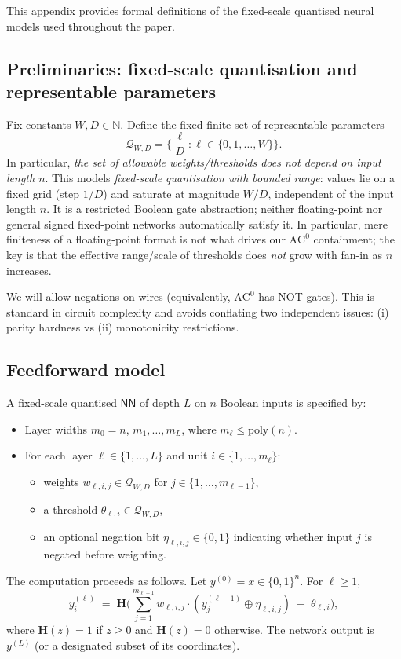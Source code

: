 \documentclass[twoside,11pt]{article}
\newcommand{\AC}{\mathrm{AC}}
\newcommand{\poly}{\mathrm{poly}}
\newcommand{\Heav}{\mathbf{H}}
\newcommand{\NN}{\mathsf{NN}}
\newcommand{\bits}{\{0,1\}}
\newcommand{\N}{\mathbb{N}}
\newcommand{\Qset}{\mathcal{Q}}
\numberwithin{theorem}{section}
\numberwithin{equation}{section}
\begin{document}
This appendix provides formal definitions of the fixed-scale quantised neural models used throughout the paper.

\subsection{Preliminaries: fixed-scale quantisation and representable parameters}
\label{app:precision}

Fix constants $W,D\in\N$.
Define the fixed finite set of representable parameters
\[
\Qset_{W,D}=\Big\{\frac{\ell}{D}: \ell\in\{0,1,\dots,W\}\Big\}.
\]
In particular, \emph{the set of allowable weights/thresholds does not depend on input length $n$}.
This models \emph{fixed-scale quantisation with bounded range}: values lie on a fixed grid (step $1/D$) and saturate at magnitude $W/D$, independent of the input length $n$.
It is a restricted Boolean gate abstraction; neither floating-point nor general signed fixed-point networks automatically satisfy it.
In particular, mere finiteness of a floating-point format is not what drives our $\AC^0$ containment; the key is that the effective range/scale of thresholds does \emph{not} grow with fan-in as $n$ increases.

We will allow negations on wires (equivalently, $\AC^0$ has NOT gates). This is standard in circuit complexity and avoids conflating two independent issues: (i) parity hardness vs (ii) monotonicity restrictions.

\subsection{Feedforward model}
\label{app:NN}

\begin{definition}
\label{def:NN-formal}
A fixed-scale quantised $\NN$ of depth $L$ on $n$ Boolean inputs is specified by:
\begin{itemize}[leftmargin=*]
\item Layer widths $m_0=n$, $m_1,\dots,m_L$, where $m_\ell\le \poly(n)$.
\item For each layer $\ell\in\{1,\dots,L\}$ and unit $i\in\{1,\dots,m_\ell\}$:
\begin{itemize}[leftmargin=2em]
\item weights $w_{\ell,i,j}\in \Qset_{W,D}$ for $j\in\{1,\dots,m_{\ell-1}\}$,
\item a threshold $\theta_{\ell,i}\in \Qset_{W,D}$,
\item an optional negation bit $\eta_{\ell,i,j}\in\{0,1\}$ indicating whether input $j$ is negated before weighting.
\end{itemize}
\end{itemize}
The computation proceeds as follows. Let $y^{(0)}=x\in\bits^n$. For $\ell\ge 1$,
\[
y^{(\ell)}_i \;=\;
\Heav\!\Big(\sum_{j=1}^{m_{\ell-1}} w_{\ell,i,j}\cdot (y^{(\ell-1)}_j \oplus \eta_{\ell,i,j}) \;-\; \theta_{\ell,i}\Big),
\]
where $\Heav(z)=1$ if $z\ge 0$ and $\Heav(z)=0$ otherwise.
The network output is $y^{(L)}$ (or a designated subset of its coordinates).
\end{definition}
\end{document}
